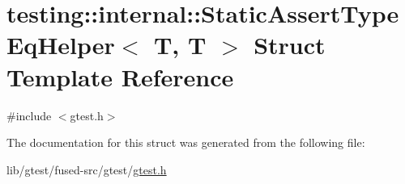 \hypertarget{structtesting_1_1internal_1_1_static_assert_type_eq_helper_3_01_t_00_01_t_01_4}{\section{testing\-:\-:internal\-:\-:Static\-Assert\-Type\-Eq\-Helper$<$ T, T $>$ Struct Template Reference}
\label{structtesting_1_1internal_1_1_static_assert_type_eq_helper_3_01_t_00_01_t_01_4}
}


{\ttfamily \#include $<$gtest.\-h$>$}



The documentation for this struct was generated from the following file\-:\begin{DoxyCompactItemize}
\item 
lib/gtest/fused-\/src/gtest/\hyperlink{fused-src_2gtest_2gtest_8h}{gtest.\-h}\end{DoxyCompactItemize}
